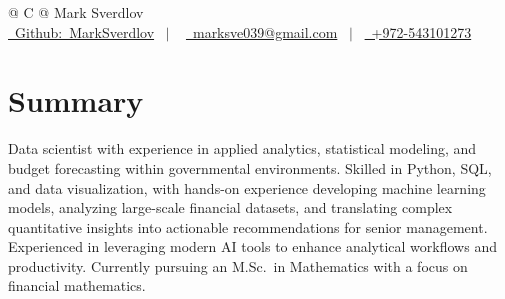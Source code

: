 \documentclass[a4paper,12pt]{article}
\begin{document}
\pagestyle{empty} 



\begin{tabularx}{\linewidth}{@{} C @{}}
\Huge{Mark Sverdlov} \\[7.5pt]
\href{https://github.com/MarkSverdlov}{\raisebox{-0.05\height}\faGithub\ Github:\ MarkSverdlov} \ $|$ \
\href{mailto:marksve039@gmail.com}{\raisebox{-0.05\height}\faEnvelope \ marksve039@gmail.com} \ $|$ \ 
\href{tel:+972543101273}{\raisebox{-0.05\height}\faMobile \ +972-543101273} \\
\end{tabularx}



\section{Summary}
Data scientist with experience in applied analytics, statistical modeling, and budget forecasting within governmental environments. Skilled in Python, SQL, and data visualization, with hands-on experience developing machine learning models, analyzing large-scale financial datasets, and translating complex quantitative insights into actionable recommendations for senior management. Experienced in leveraging modern AI tools to enhance analytical workflows and productivity. Currently pursuing an
M.Sc.\ in Mathematics with a focus on financial mathematics.
\end{document}
